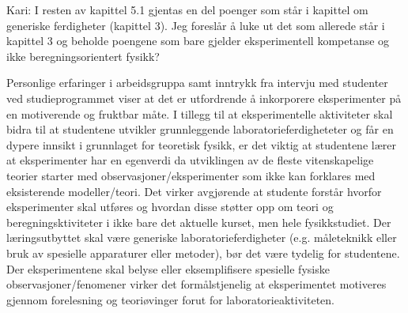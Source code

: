 \documentclass{article}
\begin{document}
{\color{red}
Kari: I resten av kapittel 5.1  gjentas en del poenger som står i kapittel om generiske ferdigheter (kapittel 3). Jeg foreslår å luke ut det som allerede står i kapittel 3 og beholde poengene som bare gjelder eksperimentell kompetanse og ikke beregningsorientert fysikk?}

Personlige erfaringer i arbeidsgruppa samt inntrykk fra intervju med studenter ved studieprogrammet viser at det er utfordrende å inkorporere eksperimenter på en motiverende og fruktbar måte.
I tillegg til at eksperimentelle aktiviteter skal bidra til at studentene utvikler grunnleggende laboratorieferdigheteter og får en dypere innsikt i grunnlaget for teoretisk fysikk, er det viktig at studentene lærer at eksperimenter har en egenverdi da utviklingen av de fleste vitenskapelige teorier starter med observasjoner/eksperimenter som ikke kan forklares med eksisterende modeller/teori.  
Det virker avgjørende at studente forstår hvorfor eksperimenter skal utføres og hvordan disse støtter opp om teori og beregningsktiviteter i ikke bare det aktuelle kurset, men hele fysikkstudiet.
Der læringsutbyttet skal være generiske laboratorieferdigheter (e.g. måleteknikk eller bruk av spesielle apparaturer eller metoder), bør det være tydelig for studentene.
Der eksperimentene skal belyse eller eksemplifisere spesielle fysiske observasjoner/fenomener virker det formålstjenelig at eksperimentet motiveres gjennom forelesning og teoriøvinger forut for laboratorieaktiviteten.
\end{document}
